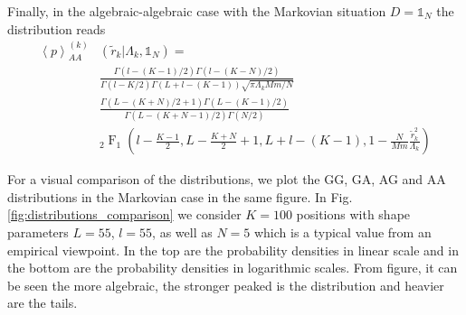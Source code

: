 Finally, in the algebraic-algebraic case with the Markovian situation
$D = \mathbb{1}_{N}$ the distribution reads
\begin{equation}
    \begin{split}
    \left\langle p \right\rangle_{AA}^{\left(k\right)} &
    \left(\tilde{r}_{k} \vert \Lambda_{k}, \mathbb{1}_{N}\right) = \\
    &\frac{\Gamma\left(l - \left(K - 1 \right) / 2\right)
    \Gamma\left(l - \left(K - N\right) / 2\right)}
    {\Gamma\left(l - K/ 2\right) \Gamma\left(L + l - \left(K - 1\right) \right)
    \sqrt{\pi \Lambda_{k}Mm/N}} \\
    &\frac{\Gamma\left(L - \left(K + N \right) / 2 + 1\right)
    \Gamma\left(L - \left(K - 1\right) / 2\right)}
    {\Gamma\left(L - \left(K + N - 1\right) / 2\right) \Gamma\left(N / 2\right)
    } \\
    & _{2}\operatorname{F}_{1} \left(l - \frac{K - 1}{2}, L -\frac{K + N}{2}+1,
    L + l - \left(K - 1\right), 1 - \frac{N}{Mm} \frac{\tilde{r}^{2}_{k}}
    {\Lambda_{k}}\right)
    \end{split}
\end{equation}

For a visual comparison of the distributions, we plot the GG, GA, AG and AA
distributions in the Markovian case in the same figure. In Fig. \ref{fig:distributions_comparison}
we consider $K = 100$ positions with shape parameters $L = 55$, $l = 55$, as
well as $N = 5$ which is a typical value from an empirical viewpoint. In the top
are the probability densities in linear scale and in the bottom are the probability
densities in logarithmic scales. From figure, it can be seen the more algebraic,
the stronger peaked is the distribution and heavier are the tails.

